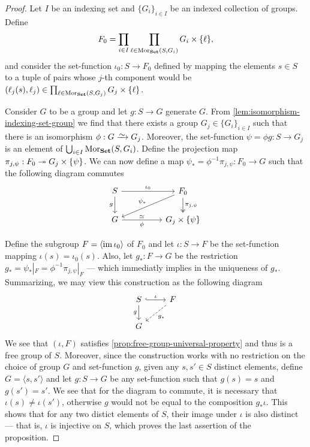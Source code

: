 \begin{proof}
Let \(I\) be an indexing set and \(\{G_{i}\}_{i \in I}\) be an indexed
collection of groups. Define
\[
  F_0 = \prod_{i \in I} \prod_{\ell \in \operatorname{Mor}_{{\textbf{Set}}}(S, G_i)} G_i \times \{\ell\},
\]
and consider the set-function \(\iota_0: S \to F_0\) defined by mapping the
elements \(s \in S\) to a tuple of pairs whose \(j\)-th component would be
\((\ell_j(s), \ell_j) \in \prod_{\ell \in \operatorname{Mor}_{{\textbf{Set}}}(S, G_j)} G_j \times
\{\ell\}\).

Consider \(G\) to be a group and let \(g: S \to G\) generate \(G\). From
\cref{lem:isomorphism-indexing-set-group} we find that there exists a group
\(G_j \in \{G_{i}\}_{i \in I}\) such that there is an isomorphism \(\phi: G
\isoto G_{j}\). Moreover, the set-function \(\psi = \phi g: S \to G_j\) is an
element of \(\bigcup_{i \in I} \operatorname{Mor}_{{\textbf{Set}}}(S, G_i)\). Define the projection map
\(\pi_{j, \psi}: F_0 \twoheadrightarrow G_j \times \{\psi\}\). We can now define a map
\(\psi_{*} = \phi^{-1} \pi_{j, \psi}: F_0 \to G\) such that the following
diagram commutes
\[
  \begin{tikzcd}
    S \ar[rr, "\iota_0"] \ar[d, swap, "g"]
      & &F_0 \ar[d, two heads, "\pi_{j, \psi}"]
    \ar[dll, swap, "\psi_{*}"] \\
    G \ar[rr, swap, "\phi", "\iso"'] & &G_j \times \{\psi\}
  \end{tikzcd}
\]

Define the subgroup \(F = \left\langle \operatorname{im} \iota_{0} \right\rangle\) of \(F_0\)
and let \(\iota: S \to F\) be the set-function mapping \(\iota(s) =
\iota_0(s)\). Also, let \(g_{*}: F \to G\) be the restriction \(g_{*} =
\psi_{*}|_{F} = \phi^{-1} \pi_{j, \psi}|_{F}\) --- which immediatly implies in
the uniqueness of \(g_{*}\). Summarizing, we may view this construction as the
following diagram
\[
  \begin{tikzcd}
    S \ar[r, hook, "\iota"] \ar[d, swap, "g"] &F \ar[dl, dashed, "g_{*}"] \\
    G &
  \end{tikzcd}
\]
We see that \((\iota, F)\) satisfies \cref{prop:free-group-universal-property}
and thus is a free group of \(S\). Moreover, since the construction works with
no restriction on the choice of group \(G\) and set-function \(g\), given any
\(s, s' \in S\) distinct elements, define \(G = \langle s, s' \rangle\) and let
\(g: S \to G\) be any set-function such that \(g(s) = s\) and \(g(s') = s'\). We
see that for the diagram to commute, it is necessary that \(\iota(s) \neq
\iota(s')\), otherwise \(g\) would not be equal to the composition \(g_{*}
\iota\). This shows that for any two distict elements of \(S\), their image
under \(\iota\) is also distinct --- that is, \(\iota\) is injective on \(S\),
which proves the last assertion of the proposition.
\end{proof}


